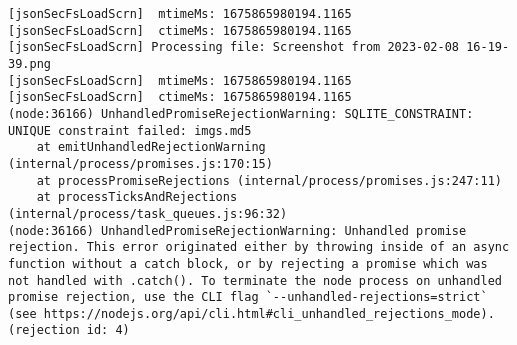  
 
 
 
 

\begin{Verbatim}
[jsonSecFsLoadScrn]  mtimeMs: 1675865980194.1165
[jsonSecFsLoadScrn]  ctimeMs: 1675865980194.1165
[jsonSecFsLoadScrn] Processing file: Screenshot from 2023-02-08 16-19-39.png
[jsonSecFsLoadScrn]  mtimeMs: 1675865980194.1165
[jsonSecFsLoadScrn]  ctimeMs: 1675865980194.1165
(node:36166) UnhandledPromiseRejectionWarning: SQLITE_CONSTRAINT: UNIQUE constraint failed: imgs.md5
    at emitUnhandledRejectionWarning (internal/process/promises.js:170:15)
    at processPromiseRejections (internal/process/promises.js:247:11)
    at processTicksAndRejections (internal/process/task_queues.js:96:32)
(node:36166) UnhandledPromiseRejectionWarning: Unhandled promise rejection. This error originated either by throwing inside of an async function without a catch block, or by rejecting a promise which was not handled with .catch(). To terminate the node process on unhandled promise rejection, use the CLI flag `--unhandled-rejections=strict` (see https://nodejs.org/api/cli.html#cli_unhandled_rejections_mode). (rejection id: 4)
\end{Verbatim}
